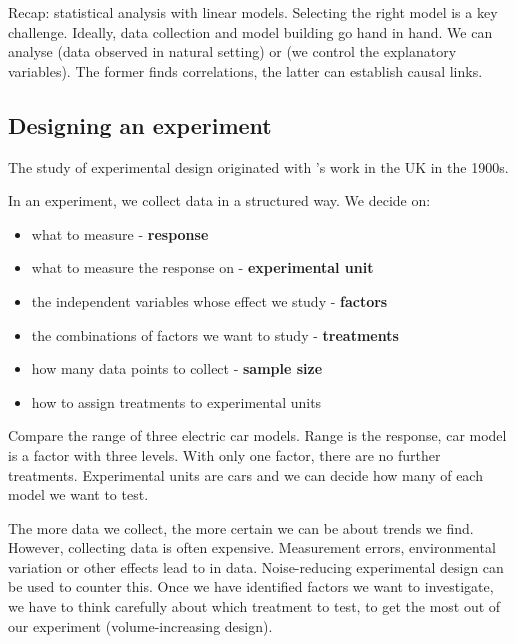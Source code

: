 Recap: statistical analysis with linear models. Selecting the right model is a key challenge. Ideally, data collection and model building go hand in hand. We can analyse  (data observed in natural setting) or  (we control the explanatory variables). The former finds correlations, the latter can establish causal links. 

\subsection{Designing an experiment}

\begin{proposition}
	The study of experimental design originated with 's work in the UK in the 1900s.
\end{proposition}

In an experiment, we collect data in a structured way. We decide on:
\begin{itemize}
	\item what to measure - \textbf{response}
	\item what to measure the response on - \textbf{experimental unit}
	\item the independent variables whose effect we study - \textbf{factors}
	\item the combinations of factors we want to study - \textbf{treatments}
	\item how many data points to collect  - \textbf{sample size}
	\item how to assign treatments to experimental units 
\end{itemize}

\begin{example}
	Compare the range of three electric car models. Range is the response, car model is a factor with three levels. With only one factor, there are no further treatments. Experimental units are cars and we can decide how many of each model we want to test.
\end{example}

The more data we collect, the more certain we can be about trends we find. However, collecting data is often expensive. Measurement errors, environmental variation or other effects lead to  in data. Noise-reducing experimental design can be used to counter this. Once we have identified factors we want to investigate, we have to think carefully about which treatment to test, to get the most out of our experiment (volume-increasing design).

